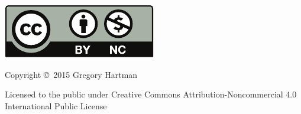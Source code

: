 \noindent\hskip -1in\begin{minipage}{2in}
\includegraphics{text/by-nc} 
\end{minipage}
\begin{minipage}{3in}
\noindent Copyright \copyright\ 2015 Gregory Hartman

Licensed to the public under Creative Commons Attribution-Noncommercial 4.0 International Public License
\end{minipage}

